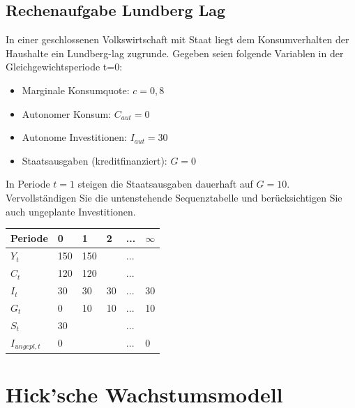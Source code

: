 \documentclass{scrartcl}
\begin{document}
\subsection{Rechenaufgabe Lundberg Lag}
In einer geschlossenen Volkswirtschaft mit Staat liegt dem Konsumverhalten der Haushalte ein Lundberg-lag zugrunde. Gegeben seien folgende Variablen in der Gleichgewichtsperiode t=0:
\begin{itemize}
	\item Marginale Konsumquote: $c = 0,8$
	\item Autonomer Konsum: $C_{aut} = 0$
	\item Autonome Investitionen: $I_{aut} = 30$
	\item Staatsausgaben (kreditfinanziert): $G = 0$
\end{itemize}
In Periode $t=1$ steigen die Staatsausgaben dauerhaft auf $G = 10$. Vervollständigen Sie die untenstehende Sequenztabelle und berücksichtigen Sie auch ungeplante Investitionen.\\
\begin{center}
	\begin{tabular}{|l|l|l|l|l|l|}
		\hline
		Periode        & 0   & 1   & 2   & ... & $\infty$ \\ \hline
		$Y_{t}$        & 150 & 150 &     & ... &          \\ \hline
		$C_t$          & 120 & 120 &     & ... &          \\ \hline
		$I_{t}$        & 30  & 30  & 30  & ... & 30       \\ \hline
		$G_t$          & 0   & 10  & 10  & ... & 10       \\ \hline
		$S_t$          & 30  &     &     & ... &          \\ \hline
		$I_{ungepl,t}$ & 0   &     &     & ... & 0        \\ \hline
	\end{tabular}
\end{center}

\newpage
\section{Hick'sche Wachstumsmodell}
\end{document}
